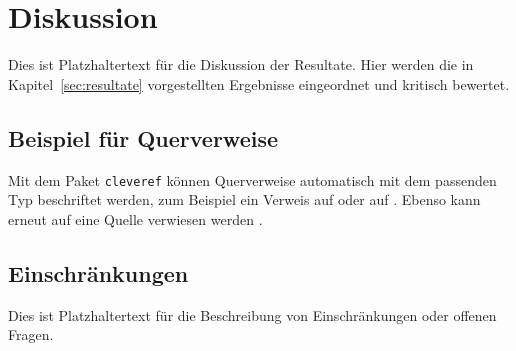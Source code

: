 \section{Diskussion}
\label{sec:diskussion}

Dies ist Platzhaltertext für die Diskussion der Resultate. Hier werden die in
Kapitel~\ref{sec:resultate} vorgestellten Ergebnisse eingeordnet und kritisch bewertet.

\subsection{Beispiel für Querverweise}
\label{subsec:querverweise}
Mit dem Paket \texttt{cleveref} können Querverweise automatisch mit dem passenden Typ
beschriftet werden, zum Beispiel ein Verweis auf  oder auf
. Ebenso kann erneut auf eine Quelle verwiesen werden
\cite{muster_beispielquelle_2025}.

\subsection{Einschränkungen}
\label{subsec:einschraenkungen}
Dies ist Platzhaltertext für die Beschreibung von Einschränkungen oder offenen Fragen.
